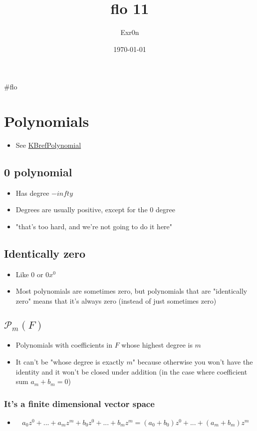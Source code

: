 \documentclass[letterpaper]{article}
\author{Exr0n}
\date{\today}
\title{flo 11}
\renewcommand{\tableofcontents}{}
\begin{document}
\tableofcontents

\#flo

\section{Polynomials}
\label{sec:orged450a9}
\begin{itemize}
\item See \href{KBrefPolynomial.org}{KBrefPolynomial}
\end{itemize}

\subsection{0 polynomial}
\label{sec:orgd0e4712}
\begin{itemize}
\item Has degree \(-infty\)
\item Degrees are usually positive, except for the \(0\) degree
\item "that's too hard, and we're not going to do it here"
\end{itemize}

\subsection{Identically zero}
\label{sec:org7ba3132}
\begin{itemize}
\item Like \(0\) or \(0 x^0\)
\item Most polynomials are sometimes zero, but polynomials that are
"identically zero" means that it's always zero (instead of just
sometimes zero)
\end{itemize}

\subsection{\(\mathcal{P}_m(F)\)}
\label{sec:org2dbb7cd}
\begin{itemize}
\item Polynomials with coefficients in \(F\) whose highest degree is \(m\)
\item It can't be "whose degree is exactly \(m\)" because otherwise you
won't have the identity and it won't be closed under addition (in the
case where coefficient sum \(a_m + b_m = 0\))
\end{itemize}

\subsubsection{It's a finite dimensional vector space}
\label{sec:org257ddec}
\begin{itemize}
\item \[a_0z^0+...+a_mz^m + b_0z^0 + ... + b_mz^m = (a_0+b_0)z^0 + ... + (a_m+b_m)z^m\]
\end{itemize}
\end{document}
